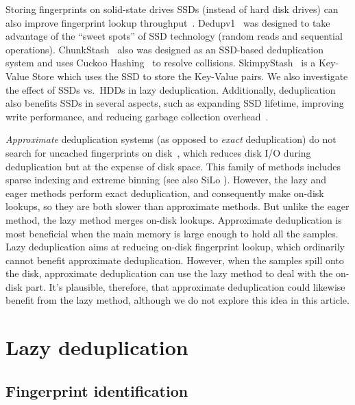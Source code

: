 \documentclass[prodmode,acmtecs]{acmsmall}
\begin{document}
Storing fingerprints on solid-state drives SSDs (instead of hard disk drives) can also improve fingerprint lookup throughput~\cite{kim2011rethinking,Kim2012SSD}.  Dedupv1~\cite{meister2010dedupv1} was designed to take advantage of the ``sweet spots'' of SSD technology (random reads and sequential operations).  ChunkStash~\cite{debnath2010chunkstash} also was designed as an SSD-based deduplication system and uses Cuckoo Hashing~\cite{pagh2001cuckoo} to resolve collisions.  SkimpyStash~\cite{debnath2011skimpystash} is a Key-Value Store which uses the SSD to store the Key-Value pairs.  We also investigate the effect of SSDs vs.\ HDDs in lazy deduplication.  Additionally, deduplication also benefits SSDs in several aspects, such as expanding SSD lifetime, improving write performance, and reducing garbage collection overhead~\cite{Kim2012Deduplication}.


\emph{Approximate} deduplication systems (as opposed to \emph{exact} deduplication) do not search for uncached fingerprints on disk~\cite{lillibridge2009sparse,bhagwat2009extreme,xia2011silo}, which reduces disk I/O during deduplication but at the expense of disk space. This family of methods includes sparse indexing \cite{lillibridge2009sparse} and extreme binning \cite{bhagwat2009extreme} (see also SiLo \cite{xia2011silo}).  However, the lazy and eager methods perform exact deduplication, and consequently make on-disk lookups, so they are both slower than approximate methods.  But unlike the eager method, the lazy method merges on-disk lookups. Approximate deduplication is most beneficial when the main memory is large enough to hold all the samples. Lazy deduplication aims at reducing on-disk fingerprint lookup, which ordinarily cannot benefit approximate deduplication. However, when the samples spill onto the disk, approximate deduplication can use the lazy method to deal with the on-disk part. It's plausible, therefore, that approximate deduplication could likewise benefit from the lazy method, although we do not explore this idea in this article.


\section{Lazy deduplication}
\label{sec:idea}

\subsection{Fingerprint identification}
\end{document}
